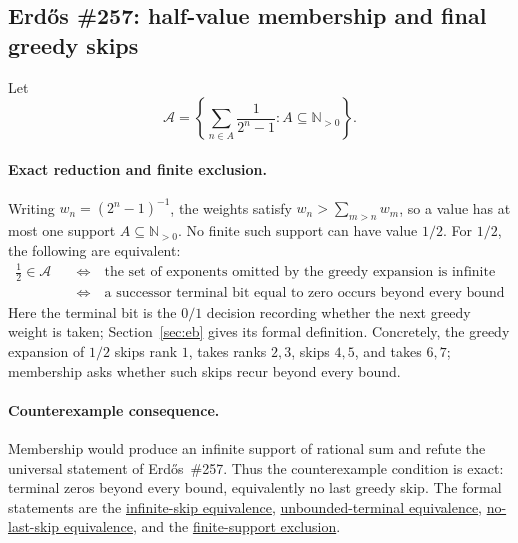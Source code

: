 \documentclass[11pt]{article}
\newcommand{\commit}{bb4e24651b37cd096d3749ef299c3317930b3a3b}
\newcommand{\repobase}{https://github.com/wcook04/plectis-lean-erdos249-257/blob/\commit}
\newcommand{\PK}{Erdos249257}
\newcommand{\lword}[4]{\href{\repobase/\PK/#1\#L#2}{#4}}
\theoremstyle{definition}
\theoremstyle{remark}
\newcommand{\Npos}{\mathbb{N}_{>0}}
\begin{document}
\subsection{Erd\H{o}s \#257: half-value membership and final greedy skips}
\label{res:halfstory}

Let
\[
  \mathcal A=\left\{\sum_{n\in A}\frac1{2^n-1}:A\subseteq\Npos\right\}.
\]

\paragraph{Exact reduction and finite exclusion.}
Writing \(w_n=(2^n-1)^{-1}\), the weights satisfy
\(w_n>\sum_{m>n}w_m\), so a value has at most one support
\(A\subseteq\Npos\).  No finite such support can have value \(1/2\).  For
\(1/2\), the following are equivalent:
\[
\begin{aligned}
\frac12\in\mathcal A
&\quad\Longleftrightarrow\quad
\text{the set of exponents omitted by the greedy expansion is infinite}\\
&\quad\Longleftrightarrow\quad
\text{a successor terminal bit equal to zero occurs beyond every bound}
\end{aligned}
\]
Here the terminal bit is the \(0/1\) decision recording whether the next
greedy weight is taken; Section~\ref{sec:eb} gives its formal definition.
Concretely, the greedy expansion of \(1/2\) skips rank \(1\), takes ranks
\(2,3\), skips \(4,5\), and takes \(6,7\); membership asks whether such
skips recur beyond every bound.

\paragraph{Counterexample consequence.}
Membership would produce an infinite support of rational sum and refute the
universal statement of Erd\H{o}s~\#257.  Thus the counterexample condition is
exact: terminal zeros beyond every bound, equivalently no last greedy skip.
The formal statements are the
\lword{GreedyAchievementSet.lean}{2583}{half_mem_mersenneAchievementSet_iff_greedySkippedSupport_infinite}{infinite-skip equivalence},
\lword{HalfCylinderHalfMembershipClassification.lean}{126}{half_mem_mersenneAchievementSet_iff_unboundedTerminalFalse}{unbounded-terminal equivalence},
\lword{HalfCylinderHalfMembershipClassification.lean}{235}{half_mem_mersenneAchievementSet_iff_no_lastHalfGreedySkip}{no-last-skip equivalence},
and the
\lword{HalfCarryReachability.lean}{589}{finite_boolSupport_ne_half}{finite-support exclusion}.
\end{document}
